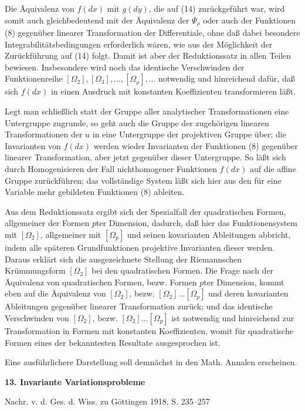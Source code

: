 \documentclass[11pt]{article}
\begin{document}
Die Äquivalenz von \(f(dx)\) mit \(g(dy)\), die auf (14) zurückgeführt
war, wird somit auch gleichbedeutend mit der Äquivalenz der \(\Psi_\rho\)
oder auch der Funktionen (8) gegenüber linearer Transformation der
Differentiale, ohne daß dabei besondere Integrabilitätsbedingungen
erforderlich wären, wie aus der Möglichkeit der Zurückführung auf (14)
folgt. Damit ist aber der Reduktionssatz in allen Teilen bewiesen.
Insbesondere wird noch das identische Verschwinden der Funktionenreihe
\([\Omega_2],[\Omega_3],\ldots,[\Omega_\rho],\ldots\) notwendig und
hinreichend dafür, daß sich \(f(dx)\) in einen Ausdruck mit konstanten
Koeffizienten transformieren läßt.

Legt man schließlich statt der Gruppe aller analytischer Transformationen
eine Untergruppe zugrunde, so geht auch die Gruppe der zugehörigen
linearen Transformationen der \(u\) in eine Untergruppe der projektiven
Gruppe über; die Invarianten von \(f(dx)\) werden wieder Invarianten der
Funktionen (8) gegenüber linearer Transformation, aber jetzt gegenüber
dieser Untergruppe. So läßt sich durch Homogenisieren der Fall
nichthomogener Funktionen \(f(dx)\) auf die affine Gruppe zurückführen;
das vollständige System läßt sich hier aus den für eine Variable mehr
gebildeten Funktionen (8) ableiten.

Aus dem Reduktionssatz ergibt sich der Spezialfall der quadratischen
Formen, allgemeiner der Formen \(p\)ter Dimension, dadurch, daß hier das
Funktionensystem mit \([\Omega_2]\), allgemeiner mit \([\Omega_p]\) und
seinen kovarianten Ableitungen abbricht, indem alle späteren
Grundfunktionen projektive Invarianten dieser werden. Daraus erklärt
sich die ausgezeichnete Stellung der Riemannschen Krümmungsform
\([\Omega_2]\) bei den quadratischen Formen. Die Frage nach der
Äquivalenz von quadratischen Formen, bezw. Formen \(p\)ter Dimension,
kommt eben auf die Äquivalenz von \([\Omega_2]\), bezw.
\([\Omega_2]\ldots[\Omega_p]\) und deren kovarianten Ableitungen
gegenüber linearer Transformation zurück; und das identische Verschwinden
von \([\Omega_2]\), bezw. \([\Omega_2]\ldots[\Omega_p]\) ist notwendig
und hinreichend zur Transformation in Formen mit konstanten Koeffizienten,
womit für quadratische Formen eines der bekanntesten Resultate
ausgesprochen ist.

Eine ausführlichere Darstellung soll demnächst in den Math. Annalen
erscheinen.

\begin{center}
{\Large\bfseries 13. Invariante Variationsprobleme}\par
\vspace{1.5em}
Nachr. v. d. Ges. d. Wiss. zu Göttingen 1918, S. 235--257
\end{center}
\end{document}
